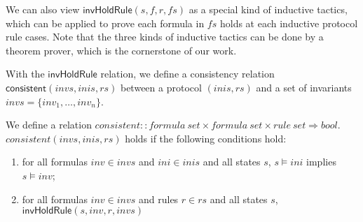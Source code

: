 \documentclass{llncs}
\begin{document}
We can also view $\mathsf{invHoldRule}(s, f, r, fs)$ as a
special kind of inductive tactics, which can be applied to prove
each formula in $fs$ holds at each inductive protocol rule cases. Note that the three kinds of inductive tactics can be done by a theorem prover, which is the cornerstone of our work.

With the $\mathsf{invHoldRule}$ relation, we define a consistency relation $\mathsf{consistent}( invs,inis, rs)$ between a protocol $(inis,rs)$ and a set of invariants $invs=\{inv_1,\ldots, inv_n\}$.

\begin{definition}
We define a relation $consistent::formula~ set \times formula~ set
\times rule ~set \Rightarrow bool$.
 $consistent( invs,inis, rs)$ holds if the following conditions hold:
\begin{enumerate}
\item for all formulas $inv\in invs$ and $ini\in inis$ and all states $s$,
$s \models ini$ implies $s \models inv$;
\item for all formulas $inv\in invs$ and rules  $r \in rs$ and all states $s$,  $\mathsf{invHoldRule}(s, inv, r, invs   )$
\end{enumerate}
\end{definition}




\end{document}
